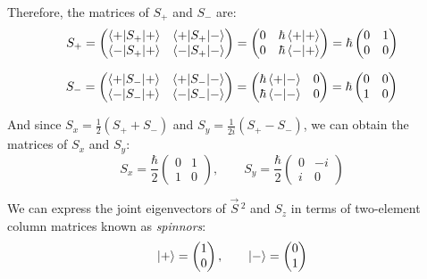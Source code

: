 Therefore, the matrices of $S_+$ and $S_-$ are:
\begin{equation}
    S_+ = \begin{pmatrix}
        \braket{+|S_+|+} & \braket{+|S_+|-} \\
        \braket{-|S_+|+} & \braket{-|S_+|-}
    \end{pmatrix} = \begin{pmatrix}
        0 & \hbar\braket{+|+} \\
        0 & \hbar\braket{-|+}
    \end{pmatrix} = \hbar\begin{pmatrix}
        0 & 1 \\
        0 & 0
    \end{pmatrix}
\end{equation}

\begin{equation}
    S_- = \begin{pmatrix}
        \braket{+|S_-|+} & \braket{+|S_-|-} \\
        \braket{-|S_-|+} & \braket{-|S_-|-}
    \end{pmatrix} = \begin{pmatrix}
        \hbar\braket{+|-} & 0 \\
        \hbar\braket{-|-} & 0
    \end{pmatrix} = \hbar\begin{pmatrix}
        0 & 0 \\
        1 & 0
    \end{pmatrix}
\end{equation}

And since $S_x = \frac12(S_+ + S_-)$ and $S_y = \frac{1}{2i}(S_+ - S_-)$, we can obtain the matrices of $S_x$ and $S_y$:
\begin{equation}
    S_x = \frac{\hbar}{2}\begin{pmatrix}
        0 & 1 \\
        1 & 0
    \end{pmatrix}, \qquad S_y = \frac{\hbar}{2}\begin{pmatrix}
        0 & -i \\
        i & 0
    \end{pmatrix}
\end{equation}

We can express the joint eigenvectors of $\vec{S}\,^2$ and $S_z$ in terms of two-element column matrices known as \textit{spinnors}:
\begin{equation}
    \ket{+} = \begin{pmatrix}
        1 \\
        0
    \end{pmatrix}, \qquad \ket{-} = \begin{pmatrix}
        0 \\
        1
    \end{pmatrix}
\end{equation}

